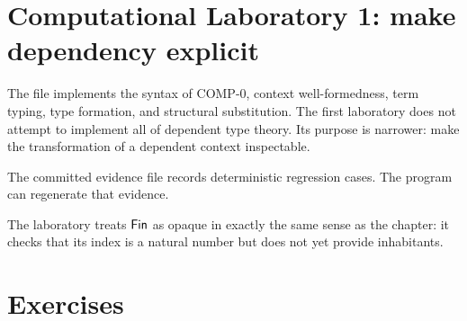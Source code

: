 \documentclass[11pt,openany]{book}
\begin{document}
\section{Computational Laboratory 1: make dependency explicit}

\begin{labbox}
The file  implements the syntax of COMP-0, context well-formedness, term typing, type formation, and structural substitution. The first laboratory does not attempt to implement all of dependent type theory. Its purpose is narrower: make the transformation of a dependent context inspectable.

The committed evidence file  records deterministic regression cases. The program can regenerate that evidence.
\end{labbox}

The laboratory treats $\mathsf{Fin}$ as opaque in exactly the same sense as the chapter: it checks that its index is a natural number but does not yet provide inhabitants.

\section{Exercises}
\end{document}
